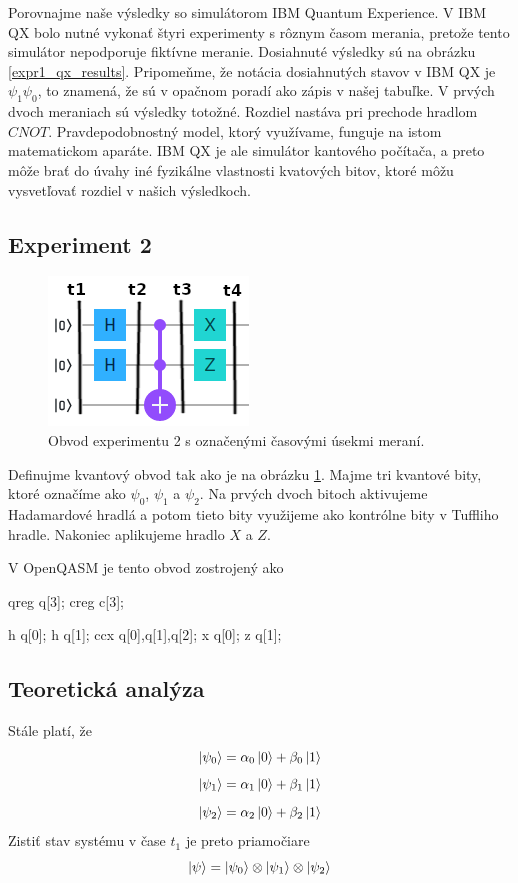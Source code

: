 Porovnajme naše výsledky so simulátorom IBM Quantum Experience. V IBM QX
bolo nutné vykonať štyri experimenty s rôznym časom merania, pretože tento
simulátor nepodporuje fiktívne meranie. Dosiahnuté výsledky sú na obrázku
\ref{expr1_qx_results}. Pripomeňme, že notácia dosiahnutých stavov v IBM QX
je \(\psi_1\psi_0\), to znamená, že sú v opačnom poradí ako zápis v našej 
tabuľke. V 
prvých dvoch meraniach sú výsledky totožné. Rozdiel nastáva pri prechode hradlom
\(CNOT\). Pravdepodobnostný model, ktorý využívame, funguje na istom 
matematickom aparáte. IBM QX je ale simulátor kantového počítača, a preto môže 
brať do úvahy iné fyzikálne vlastnosti kvatových bitov, ktoré môžu vysvetľovať
rozdiel v našich výsledkoch.

\subsection{Experiment 2}
\begin{figure} 
	\centering 
	\includegraphics[width=.5\textwidth]{figures/expr2_circuit.png} 
	\caption{Obvod experimentu 2 s označenými časovými úsekmi meraní.}

    \label{expr2_circuit}
\end{figure}

Definujme kvantový obvod tak ako je na obrázku \ref{expr2_circuit}. Majme 
tri kvantové bity, ktoré označíme ako \(\psi_0\), \(\psi_1\) a \(\psi_2\).
Na prvých dvoch bitoch aktivujeme Hadamardové hradlá a potom tieto bity 
využijeme ako kontrólne bity v Tuffliho hradle. Nakoniec aplikujeme hradlo 
\(X\) a \(Z\).

V OpenQASM je tento obvod zostrojený ako
\begin{code}
qreg q[3];
creg c[3];

h q[0];
h q[1];
ccx q[0],q[1],q[2];
x q[0];
z q[1];
\end{code}

\subsection*{Teoretická analýza}
Stále platí, že
\[\ket{\psi_0} = \alpha_0\ket{0} + \beta_0\ket{1}\]
\[\ket{\psi_1} = \alpha_1\ket{0} + \beta_1\ket{1}\]
\[\ket{\psi_2} = \alpha_2\ket{0} + \beta_2\ket{1}\]
Zistiť stav systému v čase \(t_1\) je preto priamočiare
\[\ket{\psi} = \ket{\psi_0} \otimes \ket{\psi_1} \otimes \ket{\psi_2}\]

